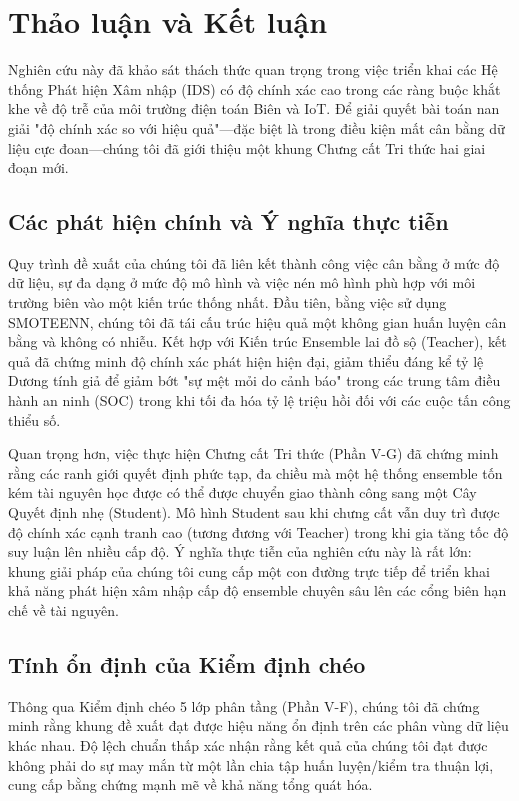 \section{Thảo luận và Kết luận}
Nghiên cứu này đã khảo sát thách thức quan trọng trong việc triển khai các Hệ thống Phát hiện Xâm nhập (IDS) có độ chính xác cao trong các ràng buộc khắt khe về độ trễ của môi trường điện toán Biên và IoT. Để giải quyết bài toán nan giải "độ chính xác so với hiệu quả"—đặc biệt là trong điều kiện mất cân bằng dữ liệu cực đoan—chúng tôi đã giới thiệu một khung Chưng cất Tri thức hai giai đoạn mới.

\subsection{Các phát hiện chính và Ý nghĩa thực tiễn}
Quy trình đề xuất của chúng tôi đã liên kết thành công việc cân bằng ở mức độ dữ liệu, sự đa dạng ở mức độ mô hình và việc nén mô hình phù hợp với môi trường biên vào một kiến trúc thống nhất. Đầu tiên, bằng việc sử dụng SMOTEENN, chúng tôi đã tái cấu trúc hiệu quả một không gian huấn luyện cân bằng và không có nhiễu. Kết hợp với Kiến trúc Ensemble lai đồ sộ (Teacher), kết quả đã chứng minh độ chính xác phát hiện hiện đại, giảm thiểu đáng kể tỷ lệ Dương tính giả để giảm bớt "sự mệt mỏi do cảnh báo" trong các trung tâm điều hành an ninh (SOC) trong khi tối đa hóa tỷ lệ triệu hồi đối với các cuộc tấn công thiểu số.

Quan trọng hơn, việc thực hiện Chưng cất Tri thức (Phần V-G) đã chứng minh rằng các ranh giới quyết định phức tạp, đa chiều mà một hệ thống ensemble tốn kém tài nguyên học được có thể được chuyển giao thành công sang một Cây Quyết định nhẹ (Student). Mô hình Student sau khi chưng cất vẫn duy trì được độ chính xác cạnh tranh cao (tương đương với Teacher) trong khi gia tăng tốc độ suy luận lên nhiều cấp độ. Ý nghĩa thực tiễn của nghiên cứu này là rất lớn: khung giải pháp của chúng tôi cung cấp một con đường trực tiếp để triển khai khả năng phát hiện xâm nhập cấp độ ensemble chuyên sâu lên các cổng biên hạn chế về tài nguyên.

\subsection{Tính ổn định của Kiểm định chéo}
Thông qua Kiểm định chéo 5 lớp phân tầng (Phần V-F), chúng tôi đã chứng minh rằng khung đề xuất đạt được hiệu năng ổn định trên các phân vùng dữ liệu khác nhau. Độ lệch chuẩn thấp xác nhận rằng kết quả của chúng tôi đạt được không phải do sự may mắn từ một lần chia tập huấn luyện/kiểm tra thuận lợi, cung cấp bằng chứng mạnh mẽ về khả năng tổng quát hóa.

